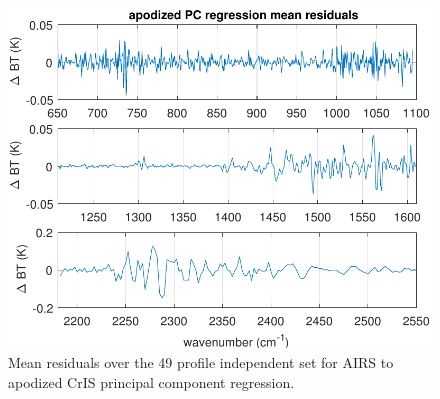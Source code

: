\documentclass[journal]{IEEEtran}
\begin{document}

\begin{figure} %
  \centering
  \includegraphics[width=\linewidth]{figures/ap_pc_regr.pdf}
  \caption{Mean residuals over the 49 profile independent set for
    AIRS to apodized CrIS principal component regression.}
  \label{dreg6}
\end{figure}

\end{document}
